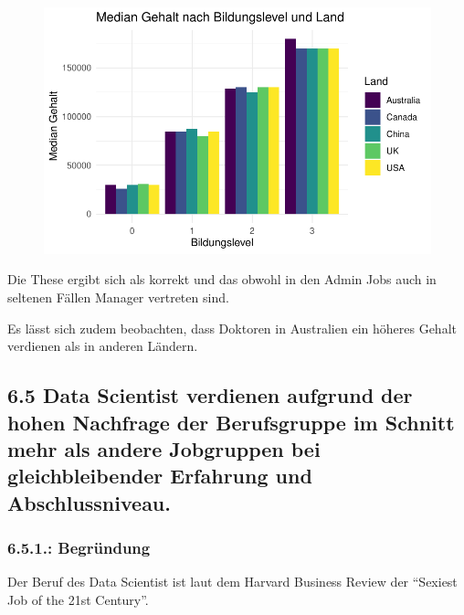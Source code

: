 \documentclass[
  letterpaper,
  DIV=11,
  numbers=noendperiod]{scrartcl}
\begin{document}
\begin{figure}[H]

{\centering \includegraphics{main_doc_files/figure-pdf/unnamed-chunk-85-1.pdf}

}

\end{figure}

Die These ergibt sich als korrekt und das obwohl in den Admin Jobs auch
in seltenen Fällen Manager vertreten sind.

Es lässt sich zudem beobachten, dass Doktoren in Australien ein höheres
Gehalt verdienen als in anderen Ländern.

\hypertarget{data-scientist-verdienen-aufgrund-der-hohen-nachfrage-der-berufsgruppe-im-schnitt-mehr-als-andere-jobgruppen-bei-gleichbleibender-erfahrung-und-abschlussniveau.}{%
\subsection{6.5 Data Scientist verdienen aufgrund der hohen Nachfrage
der Berufsgruppe im Schnitt mehr als andere Jobgruppen bei
gleichbleibender Erfahrung und
Abschlussniveau.}\label{data-scientist-verdienen-aufgrund-der-hohen-nachfrage-der-berufsgruppe-im-schnitt-mehr-als-andere-jobgruppen-bei-gleichbleibender-erfahrung-und-abschlussniveau.}}

\hypertarget{begruxfcndung}{%
\subsubsection{6.5.1.: Begründung}\label{begruxfcndung}}

Der Beruf des Data Scientist ist laut dem Harvard Business Review der
``Sexiest Job of the 21st Century''.
\end{document}
